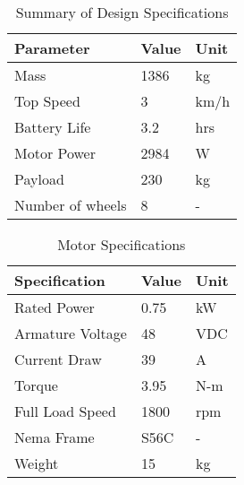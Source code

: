\begin{table}[htbp]
\centering
\caption{Summary of Design Specifications}
\begin{tabular}{| lll |} \hline
Parameter & Value & Unit \\ \hline
Mass & 1386 & kg \\
Top Speed & 3 & km/h \\
Battery Life & 3.2 & hrs \\
Motor Power & 2984 & W \\
Payload & 230 & kg \\
Number of wheels & 8 & - \\ \hline
\end{tabular}
\label{tab:design_spec}
\end{table}


  \begin{table}[htbp]
 \centering
 \caption{Motor Specifications}
 \begin{tabular}{| lll |} \hline
 Specification & Value & Unit \\ \hline
Rated Power & 0.75 & kW \\
Armature Voltage & 48 & VDC \\
Current Draw & 39 & A \\
Torque & 3.95 & N-m \\
Full Load Speed & 1800 & rpm \\
Nema Frame & S56C & - \\
Weight & 15 & kg \\ \hline
 \end{tabular}
 \label{tab:motor_spec}
 \end{table}
 
 